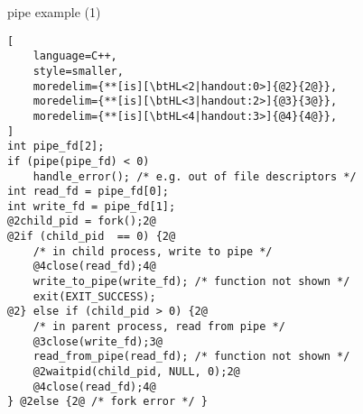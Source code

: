 
\begin{frame}[fragile,label=pipeExample]{pipe example (1)}
\begin{lstlisting}[
    language=C++,
    style=smaller,
    moredelim={**[is][\btHL<2|handout:0>]{@2}{2@}},
    moredelim={**[is][\btHL<3|handout:2>]{@3}{3@}},
    moredelim={**[is][\btHL<4|handout:3>]{@4}{4@}},
]
int pipe_fd[2];
if (pipe(pipe_fd) < 0)
    handle_error(); /* e.g. out of file descriptors */
int read_fd = pipe_fd[0];
int write_fd = pipe_fd[1];
@2child_pid = fork();2@
@2if (child_pid  == 0) {2@
    /* in child process, write to pipe */
    @4close(read_fd);4@
    write_to_pipe(write_fd); /* function not shown */
    exit(EXIT_SUCCESS);
@2} else if (child_pid > 0) {2@
    /* in parent process, read from pipe */
    @3close(write_fd);3@
    read_from_pipe(read_fd); /* function not shown */
    @2waitpid(child_pid, NULL, 0);2@
    @4close(read_fd);4@
} @2else {2@ /* fork error */ }
\end{lstlisting}
\end{frame}

